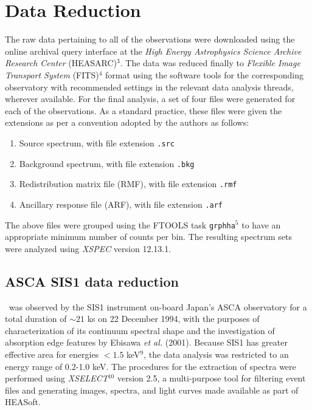 \section{Data Reduction} \label{sec:reduction-analysis}
    The raw data pertaining to all of the observations were downloaded using the online archival query interface at the \textit{High Energy Astrophysics Science Archive Research Center} (HEASARC)$^3$. The data was reduced finally to \textit{Flexible Image Transport System} (FITS)$^4$ format using the software tools for the corresponding observatory with recommended settings in the relevant data analysis threads, wherever available. For the final analysis, a set of four files were generated for each of the observations. As a standard practice, these files were given the extensions as per a convention adopted by the authors as follows:
    \begin{enumerate}
    	\item Source spectrum, with file extension \texttt{.src}
    	\item Background spectrum, with file extension \texttt{.bkg}
    	\item Redistribution matrix file (RMF), with file extension \texttt{.rmf}
    	\item Ancillary response file (ARF), with file extension \texttt{.arf}
    \end{enumerate}
    The above files were grouped using the FTOOLS task \texttt{grphha}$^{5}$ to have an appropriate minimum number of counts per bin. The resulting spectrum sets were analyzed using \textit{XSPEC} version 12.13.1.
    
    \subsection{ASCA SIS1 data reduction}
    	\source\ was observed by the SIS1 instrument on-board Japan's ASCA observatory for a total duration of $\sim 21$ ks on 22 December 1994, with the purposes of characterization of its continuum spectral shape and the investigation of absorption edge features by Ebisawa \textit{et al.} (2001). %
    	Because SIS1 has greater effective area for energies $<1.5$ keV$^9$, the data analysis was restricted to an energy range of 0.2-1.0 keV. The procedures for the extraction of spectra were performed using \textit{XSELECT}$^{10}$ version 2.5, a multi-purpose tool for filtering event files and generating images, spectra, and light curves made available as part of HEASoft.
    	
